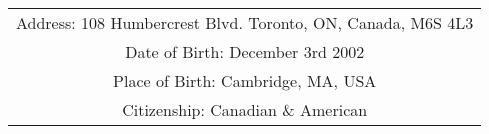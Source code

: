 \begin{tabularx}{\linewidth}{@{} C @{}}
    Address: 108 Humbercrest Blvd. Toronto, ON, Canada, M6S 4L3 \\
    Date of Birth: December 3rd 2002 \\
    Place of Birth: Cambridge, MA, USA \\
    Citizenship: Canadian \& American \\ 
\end{tabularx}